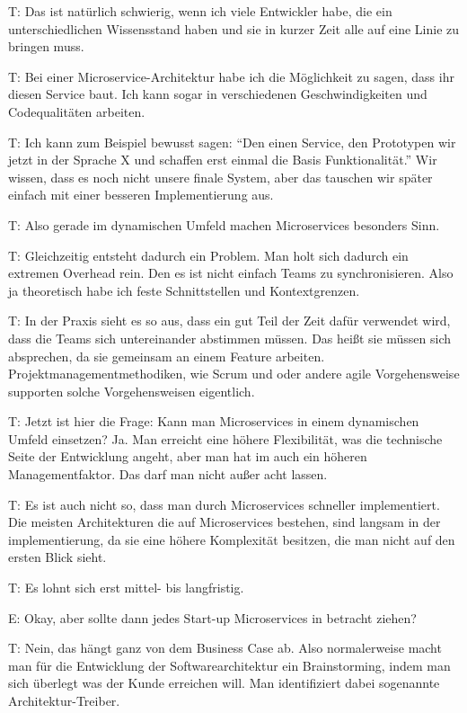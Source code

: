 T: Das ist natürlich schwierig, wenn ich viele Entwickler habe, die ein unterschiedlichen Wissensstand haben und sie in kurzer Zeit alle auf eine Linie zu bringen muss.

\label{appendix:t-7}
T: Bei einer Microservice-Architektur habe ich die Möglichkeit zu sagen, dass ihr diesen Service baut. Ich kann sogar in verschiedenen Geschwindigkeiten und Codequalitäten arbeiten.

T: Ich kann zum Beispiel bewusst sagen: “Den einen Service, den Prototypen wir jetzt in der Sprache X und schaffen erst einmal die Basis Funktionalität.” Wir wissen, dass es noch nicht unsere finale System, aber das tauschen wir später einfach mit einer besseren Implementierung aus.

\label{appendix:t-8}
T: Also gerade im dynamischen Umfeld machen Microservices besonders Sinn.

\label{appendix:t-9}
T: Gleichzeitig entsteht dadurch ein Problem. Man holt sich dadurch ein extremen Overhead rein. Den es ist nicht einfach Teams zu synchronisieren. Also ja theoretisch habe ich feste Schnittstellen und Kontextgrenzen.

\label{appendix:t-10}
T: In der Praxis sieht es so aus, dass ein gut Teil der Zeit dafür verwendet wird, dass die Teams sich untereinander abstimmen müssen. Das heißt sie müssen sich absprechen, da sie gemeinsam an einem Feature arbeiten. Projektmanagementmethodiken, wie Scrum und oder andere agile Vorgehensweise supporten solche Vorgehensweisen eigentlich.

\label{appendix:t-11} \label{appendix:t-12}
T: Jetzt ist hier die Frage: Kann man Microservices in einem dynamischen Umfeld einsetzen?  Ja. Man erreicht eine höhere Flexibilität, was die technische Seite der Entwicklung angeht, aber man hat im auch ein höheren Managementfaktor. Das darf man nicht außer acht lassen.

T: Es ist auch nicht so, dass man durch Microservices schneller implementiert. Die meisten Architekturen die auf Microservices bestehen, sind langsam in der implementierung, da sie eine höhere Komplexität besitzen, die man nicht auf den ersten Blick sieht.

\label{appendix:t-13}
T: Es lohnt sich erst mittel- bis langfristig.

E: Okay, aber sollte dann jedes Start-up Microservices in betracht ziehen?

\label{appendix:t-14}
T: Nein, das hängt ganz von dem Business Case ab. Also normalerweise macht man für die Entwicklung der Softwarearchitektur ein Brainstorming, indem man sich überlegt was der Kunde erreichen will. Man identifiziert dabei sogenannte Architektur-Treiber.

